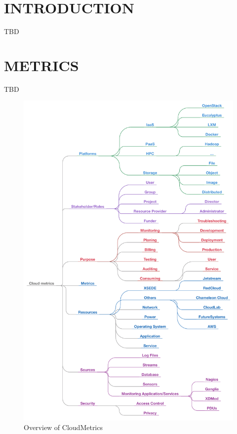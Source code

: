 \documentclass{sig-alternate-05-2015}
\begin{document}
 

 


\section{INTRODUCTION}
TBD

\section{METRICS}
TBD



\begin{figure}[h!] 
  \centering 
    \includegraphics[width=1.0\columnwidth]{images/cloudmetric.pdf} 
  \caption{Overview of CloudMetrics}\label{F:taxonomy-1} 
\end{figure} 
\end{document}
